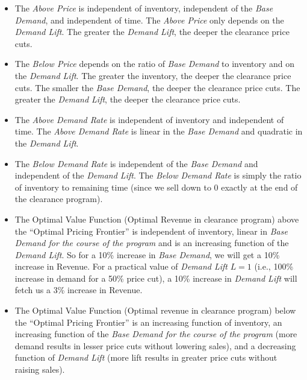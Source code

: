 \documentclass[12pt]{amsart}
\begin{document}
\begin{itemize}
\item The {\em Above Price} is independent of inventory, independent of the {\em Base Demand}, and independent of time. The {\em Above Price} only depends on the {\em Demand Lift}. The greater the {\em Demand Lift}, the deeper the clearance price cuts.
\item The {\em Below Price} depends on the ratio of {\em Base Demand} to inventory and on the {\em Demand Lift}. The greater the inventory, the deeper the clearance price cuts. The smaller the {\em Base Demand}, the deeper the clearance price cuts. The greater the {\em Demand Lift}, the deeper the clearance price cuts.
\item The {\em Above Demand Rate} is independent of inventory and independent of time. The {\em Above Demand Rate} is linear in the {\em Base Demand} and quadratic in the {\em Demand Lift}.
\item The {\em Below Demand Rate} is independent of the {\em Base Demand} and independent of the {\em Demand Lift}. The {\em Below Demand Rate} is simply the ratio of inventory to remaining time (since we sell down to 0 exactly at the end of the clearance program).
\item The Optimal Value Function (Optimal Revenue in clearance program) above the ``Optimal Pricing Frontier'' is independent of inventory, linear in {\em Base Demand for the course of the program} and is an increasing function of the {\em Demand Lift}. So for a 10\% increase in {\em Base Demand}, we will get a 10\% increase in Revenue. For a practical value of {\em Demand Lift} $L = 1$ (i.e., 100\% increase in demand for a 50\% price cut), a 10\% increase in {\em Demand Lift} will fetch us a 3\% increase in Revenue.
\item The Optimal Value Function (Optimal revenue in clearance program) below the ``Optimal Pricing Frontier'' is an increasing function of inventory, an increasing function of the {\em Base Demand for the course of the program} (more demand results in lesser price cuts without lowering sales), and a decreasing function of {\em Demand Lift} (more lift results in greater price cuts without raising sales).
\end{itemize}
   
     
   
\end{document}
